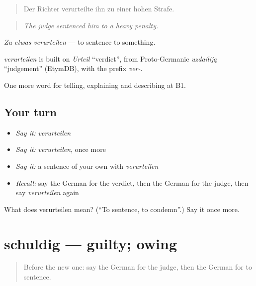 \begin{quote}
Der Richter verurteilte ihn zu einer hohen Strafe.
\end{quote}

\begin{quote}
\emph{The judge sentenced him to a heavy penalty.}
\end{quote}

\emph{Zu etwas verurteilen} — to sentence to something.

\begin{cousinweb}
\emph{verurteilen} is built on \emph{Urteil} \textquotedblleft{}verdict\textquotedblright{}, from Proto-Germanic \emph{uzdailiją} \textquotedblleft{}judgement\textquotedblright{} (EtymDB), with the prefix \emph{ver-}.
\end{cousinweb}

\begin{grammarlens}[title={What you've built}]
One more word for telling, explaining and describing at B1.
\end{grammarlens}

\subsection*{Your turn}
\begin{itemize}
\raggedright
  \item \emph{Say it:} \emph{verurteilen}
  \item \emph{Say it:} \emph{verurteilen}, once more
  \item \emph{Say it:} a sentence of your own with \emph{verurteilen}
  \item \emph{Recall:} say the German for the verdict, then the German for the judge, then say \emph{verurteilen} again
\end{itemize}

\begin{tcolorbox}[breakable,colback=teal!4,colframe=teal!35!black,title={Before you move on}]
What does verurteilen mean? (\textquotedblleft{}To sentence, to condemn\textquotedblright{}.) Say it once more.
\end{tcolorbox}
\section[schuldig]{schuldig — guilty; owing}

\label{lesson:GE-C286-schuldig}



\begin{quote}
Before the new one: say the German for the judge, then the German for to sentence.
\end{quote}


